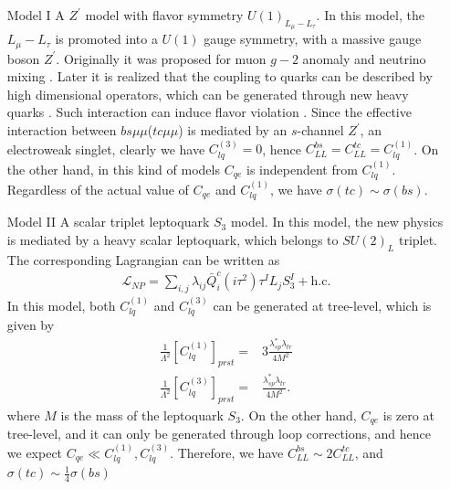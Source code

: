 \documentclass[a4paper,11pt]{article}
\begin{document}
\begin{enumerate}
    \item[Model I]   A $Z^{\prime}$ model with flavor symmetry $U(1)_{L_{\mu}-L_{\tau}}$.
        In this model, the $L_{\mu}-L_{\tau}$ is promoted into a $U(1)$ gauge symmetry,
      with a massive gauge boson $Z^{\prime}$.
    Originally it was proposed for muon $g-2$ anomaly \cite{Baek:2001kca,Allanach:2015gkd} and neutrino mixing \cite{Ma:2001md}.
    Later it is realized that the coupling to quarks can be described by high dimensional operators, which can be generated through new heavy quarks \cite{Fox:2011qd}.
    Such interaction can induce flavor violation \cite{Altmannshofer:2014cfa,Crivellin:2015mga,Crivellin:2015lwa}.
    Since the effective interaction between $bs\mu\mu$($tc\mu\mu$) is mediated by an $s$-channel $Z^{\prime}$, an electroweak singlet,
    clearly we have $C_{lq}^{(3)}=0$, hence $C_{LL}^{bs}=C_{LL}^{tc}=C_{lq}^{(1)}$.
    On the other hand, in this kind of models $C_{qe}$ is independent from $C_{lq}^{(1)}$.
    Regardless of the actual value of $C_{qe}$ and $C_{lq}^{(1)}$,
    we have $\sigma(tc)\sim\sigma(bs)$.

    \item[Model II] A scalar triplet leptoquark $S_3$ model.
        In this model, the new physics is mediated by a heavy scalar leptoquark, which belongs to $SU(2)_L$ triplet.
        The corresponding Lagrangian can be written as \cite{Dorsner:2016wpm}
        \begin{align}
            \mathcal{L}_{NP}=\sum_{i,j}\lambda_{ij}\bar{Q}_i^c(i\tau^2)\tau^{I}L_jS_3^{I}+\textrm{h.c.}
        \end{align}
        In this model, both $C_{lq}^{(1)}$ and $C_{lq}^{(3)}$ can be generated at tree-level, which is given by \cite{Gherardi:2020det}
        \begin{align}
            \frac{1}{\Lambda^2}[C_{lq}^{(1)}]_{prst}=&3\frac{\lambda_{sp}^{*}\lambda_{tr}}{4M^2}\\
            \frac{1}{\Lambda^2}[C_{lq}^{(3)}]_{prst}=&\frac{\lambda_{sp}^{*}\lambda_{tr}}{4M^2}.
        \end{align}
        where $M$ is the mass of the leptoquark $S_3$.
        On the other hand, $C_{qe}$ is zero at tree-level, and it can only be generated through loop corrections, and hence we expect $C_{qe}\ll C_{lq}^{(1)},C_{lq}^{(3)}$.
        Therefore, we have $C_{LL}^{bs}\sim2C_{LL}^{tc}$,
        and $\sigma(tc)\sim\frac{1}{4}\sigma(bs)$


\end{enumerate}
\end{document}
